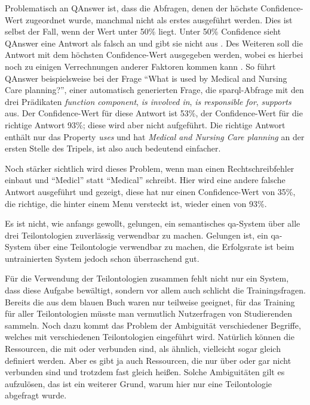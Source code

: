 Problematisch an QAnswer ist, dass die Abfragen, denen der höchste Confidence-Wert zugeordnet wurde, manchmal nicht als erstes ausgeführt werden.
Dies ist selbst der Fall, wenn der Wert unter 50\% liegt.
Unter 50\% Confidence sieht QAnswer eine Antwort als falsch an und gibt sie nicht aus \citep{qanswer}.
Des Weiteren soll die Antwort mit dem höchsten Confidence-Wert ausgegeben werden, wobei es hierbei noch zu einigen Verrechnungen anderer Faktoren kommen kann \citep{qanswerpatentapplication}.
So führt QAnswer beispielsweise bei der Frage \enquote{What is used by Medical and Nursing Care planning?},
einer automatisch generierten Frage, die \ac{sparql}-Abfrage mit den drei Prädikaten \emph{function component}, \emph{is involved in}, \emph{is responsible for}, \emph{supports} aus.
Der Confidence-Wert für diese Antwort ist 53\%, der Confidence-Wert für die richtige Antwort 93\%; diese wird aber nicht aufgeführt.
Die richtige Antwort enthält nur das Property \emph{uses} und hat \emph{Medical and Nursing Care planning} an der ersten Stelle des Tripels, ist also auch bedeutend einfacher.

Noch stärker sichtlich wird dieses Problem, wenn man einen Rechtschreibfehler einbaut und \enquote{Medicl} statt \enquote {Medical} schreibt.
Hier wird eine andere falsche Antwort ausgeführt und gezeigt, diese hat nur einen Confidence-Wert von 35\%, die richtige, die hinter einem Menu versteckt ist, wieder einen von 93\%.

Es ist nicht, wie anfangs gewollt, gelungen, ein semantisches \ac{qa}-System über alle drei Teilontologien zuverlässig verwendbar zu machen.
Gelungen ist, ein \ac{qa}-System über eine Teilontologie verwendbar zu machen, die Erfolgsrate ist beim untrainierten System jedoch schon überraschend gut.

Für die Verwendung der Teilontologien zusammen fehlt nicht nur ein System, dass diese Aufgabe bewältigt, sondern vor allem auch schlicht die Trainingsfragen.
Bereits die aus dem blauen Buch waren nur teilweise geeignet, für das Training für aller Teilontologien müsste man vermutlich Nutzerfragen von Studierenden sammeln.
Noch dazu kommt das Problem der Ambiguität verschiedener Begriffe, welches mit verschiedenen Teilontologien eingeführt wird.
Natürlich können die Ressourcen, die mit  oder  verbunden sind, als ähnlich, vielleicht sogar gleich definiert werden.
Aber es gibt ja auch Ressourcen, die nur über  oder gar nicht verbunden sind und trotzdem fast gleich heißen.
Solche Ambiguitäten gilt es aufzulösen, das ist ein weiterer Grund, warum hier nur eine Teilontologie abgefragt wurde.

